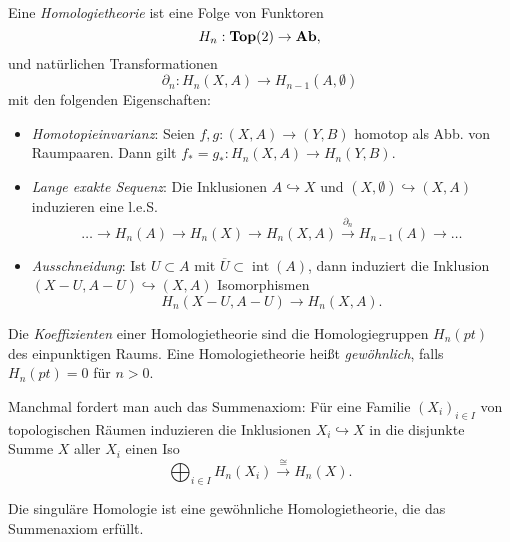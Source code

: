 \documentclass{cheat-sheet}
\DeclareMathOperator{\inte}{int} %
\newcommand{\clos}[1]{\overline{#1}} %
\begin{document}



\begin{defn}\mbox{}\\
  Eine \emph{Homologietheorie} ist eine Folge von Funktoren
  \[ H_n : \mathbf{Top}(2) \to \mathbf{Ab}, \]
  und natürlichen Transformationen
  \[ \partial_n : H_n(X, A) \to H_{n-1}(A, \emptyset) \]
  mit den folgenden Eigenschaften:
  \begin{itemize}
    \item \emph{Homotopieinvarianz}: Seien $f, g : (X, A) \to (Y, B)$ homotop als Abb. von Raumpaaren. Dann gilt $f_* \!=\! g_* : H_n(X, A) \to H_n(Y, B)$.
    \item \emph{Lange exakte Sequenz}: Die Inklusionen $A \hookrightarrow X$ und $(X, \emptyset) \hookrightarrow (X, A)$ induzieren eine l.e.S.
    \[ \ldots \to H_n(A) \to H_n(X) \to H_n(X, A) \xrightarrow{\partial_n} H_{n-1}(A) \to \ldots \]
    \item \emph{Ausschneidung}: Ist $U \subset A$ mit $\clos{U} \subset \inte(A)$, dann induziert die Inklusion $(X - U, A - U) \hookrightarrow (X, A)$ Isomorphismen
    \[ H_n(X-U, A-U) \to H_n(X,A). \]
  \end{itemize}
\end{defn}

\begin{defn}
  Die \emph{Koeffizienten} einer Homologietheorie sind die Homologiegruppen $H_n(pt)$ des einpunktigen Raums.
  Eine Homologietheorie heißt \emph{gewöhnlich}, falls $H_n(pt) = 0$ für $n > 0$.
\end{defn}

\begin{bem}
  Manchmal fordert man auch das Summenaxiom: Für eine Familie $(X_i)_{i \in I}$ von topologischen Räumen induzieren die Inklusionen $X_i \hookrightarrow X$ in die disjunkte Summe $X$ aller $X_i$ einen Iso
  \[ \bigoplus_{i \in I} H_n(X_i) \xrightarrow{\cong} H_n(X). \]
\end{bem}

\begin{bem}
  Die singuläre Homologie ist eine gewöhnliche Homologietheorie, die das Summenaxiom erfüllt.
\end{bem}

\end{document}
